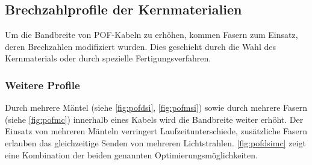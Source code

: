 \subsection{Brechzahlprofile der Kernmaterialien}
\label{subsec:pofbrechzahlprofile}

Um die Bandbreite von POF-Kabeln zu erhöhen, kommen Fasern zum Einsatz, deren
Brechzahlen modifiziert wurden. Dies geschieht durch die Wahl des Kernmaterials
oder durch spezielle Fertigungsverfahren.




\subsubsection{Weitere Profile}

Durch mehrere Mäntel (siehe \autoref{fig:pofdsi}, \autoref{fig:pofmsi}) sowie
durch mehrere Fasern (siehe \autoref{fig:pofmc}) innerhalb eines Kabels wird die
Bandbreite weiter erhöht. Der Einsatz von mehreren Mänteln verringert
Laufzeitunterschiede, zusätzliche Fasern erlauben das gleichzeitige Senden von
mehreren Lichtstrahlen. \autoref{fig:pofdsimc} zeigt eine Kombination der beiden
genannten Optimierungsmöglichkeiten. \cite{pofacprofile}

